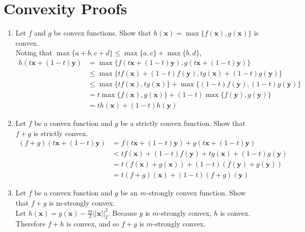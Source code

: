 \documentclass{article}
\begin{document}
\section{Convexity Proofs}
\begin{enumerate}[label=\arabic*.]
\item Let $f$ and $g$ be convex functions. Show that $h(\mathbf{x}) = \max \{f(\mathbf{x}), g(\mathbf{x})\}$ is convex. \\
{\color{blue} Noting that $\max \{ a+b, c+d \} \leq \max \{ a, c\} + \max \{b, d\}$,
\begin{align*}
h(t\mathbf{x} + (1-t)\mathbf{y}) &= \max \{ f(t\mathbf{x} + (1-t)\mathbf{y}), g(t\mathbf{x} + (1-t)\mathbf{y}) \} \\
&\leq \max \{ tf(\mathbf{x} )+ (1-t)f(\mathbf{y}), tg(\mathbf{x}) + (1-t)g(\mathbf{y}) \} \\
&\leq \max \{ tf(\mathbf{x}), tg(\mathbf{x})\} + \max \{ (1-t)f(\mathbf{y}), (1-t)g(\mathbf{y}) \} \\
&= t\max \{ f(\mathbf{x}), g(\mathbf{x})\} + (1-t)\max \{ f(\mathbf{y}), g(\mathbf{y}) \} \\
&= th(\mathbf{x}) + (1-t)h(\mathbf{y})
\end{align*}
}
\item Let $f$ be a convex function and $g$ be a strictly convex function. Show that $f + g$ is strictly convex. \\
{\color{blue}
\begin{align*}
(f + g)(t\mathbf{x} + (1-t)\mathbf{y}) &= f(t\mathbf{x} + (1-t)\mathbf{y}) + g(t\mathbf{x} + (1-t)\mathbf{y}) \\
&< tf(\mathbf{x}) + (1-t)f(\mathbf{y}) + tg(\mathbf{x}) + (1-t)g(\mathbf{y}) \\
&= t(f(\mathbf{x}) + g(\mathbf{x})) + (1-t)(f(\mathbf{y}) + g(\mathbf{y})) \\
&= t(f + g)(\mathbf{x}) + (1-t)(f + g)(\mathbf{y})
\end{align*}
}
\item Let $f$ be a convex function and $g$ be an $m$-strongly convex function. Show that $f + g$ is m-strongly convex. \\
{\color{blue} Let $h(\mathbf{x}) = g(\mathbf{x}) - \frac{m}{2} ||\mathbf{x}||_2^2$. Because $g$ is $m$-strongly convex, $h$ is convex. Therefore $f + h$ is convex, and so $f + g$ is $m$-strongly convex.}
\end{enumerate}
\end{document}
